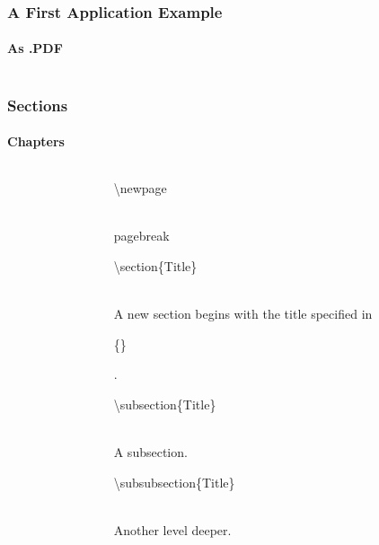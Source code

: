 \begin{frame}
\frametitle{A First Application Example}
\framesubtitle{As .PDF}
\begin{columns}
\begin{column}{0.5\textwidth}
\begin{ttfamily}\scriptsize

 \normalsize
\end{ttfamily}
\end{column}

\begin{column}{0.5\textwidth}
\end{column}
\end{columns}
\end{frame}



\begin{frame}
\frametitle{Sections}
\framesubtitle{Chapters}
\begin{columns}
\begin{column}{0.5\textwidth}
\begin{ttfamily}\scriptsize

\end{ttfamily}
\end{column}
\begin{column}{0.5\textwidth}
\begin{ttfamily}\color{nounibaredI}\textbackslash newpage\color{black}\end{ttfamily}\\
pagebreak\\[3mm]
\begin{ttfamily}\color{unibablueI}\textbackslash section\color{black}\{Title\}\end{ttfamily}\\
A new section begins with the title specified in \begin{ttfamily}\{\}\end{ttfamily}.\\[3mm]
\begin{ttfamily}\color{unibablueI}\textbackslash subsection\color{black}\{Title\}\end{ttfamily}\\
A subsection.\\[3mm]
\begin{ttfamily}\color{unibablueI}\textbackslash subsubsection\color{black}\{Title\}\end{ttfamily}\\
Another level deeper.\\
\end{column}
\end{columns}
\end{frame}

